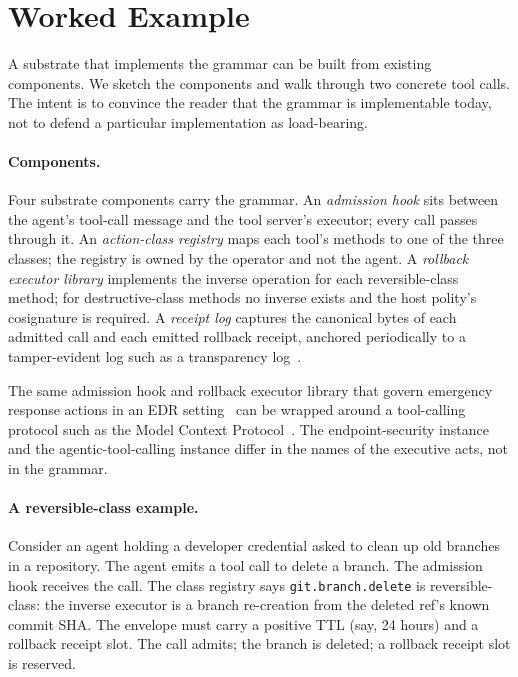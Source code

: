 \section{Worked Example}
\label{sec:impl}

A substrate that implements the grammar can be built from existing components. We sketch the components and walk through two concrete tool calls. The intent is to convince the reader that the grammar is implementable today, not to defend a particular implementation as load-bearing.

\paragraph{Components.}
Four substrate components carry the grammar. An \emph{admission hook} sits between the agent's tool-call message and the tool server's executor; every call passes through it. An \emph{action-class registry} maps each tool's methods to one of the three classes; the registry is owned by the operator and not the agent. A \emph{rollback executor library} implements the inverse operation for each reversible-class method; for destructive-class methods no inverse exists and the host polity's cosignature is required. A \emph{receipt log} captures the canonical bytes of each admitted call and each emitted rollback receipt, anchored periodically to a tamper-evident log such as a transparency log~\cite{rekor2021}.

The same admission hook and rollback executor library that govern emergency response actions in an EDR setting~\cite{programmableSovereignty2026} can be wrapped around a tool-calling protocol such as the Model Context Protocol~\cite{anthropicMCP2024}. The endpoint-security instance and the agentic-tool-calling instance differ in the names of the executive acts, not in the grammar.

\paragraph{A reversible-class example.}
Consider an agent holding a developer credential asked to clean up old branches in a repository. The agent emits a tool call to delete a branch. The admission hook receives the call. The class registry says \texttt{git.branch.delete} is reversible-class: the inverse executor is a branch re-creation from the deleted ref's known commit SHA. The envelope must carry a positive TTL (say, 24 hours) and a rollback receipt slot. The call admits; the branch is deleted; a rollback receipt slot is reserved.

